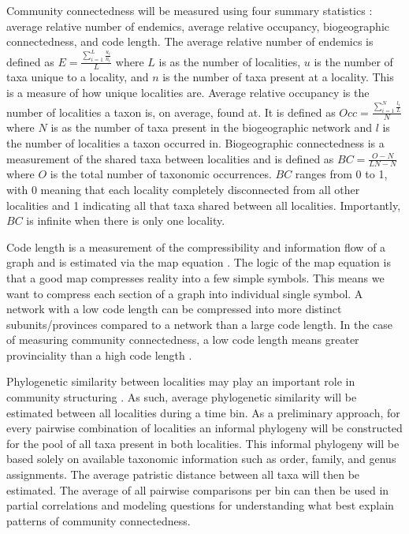 \documentclass[12pt,letterpaper]{article}
\begin{document}
Community connectedness will be measured using four summary statistics \citep{Sidor2013}: average relative number of endemics, average relative occupancy, biogeographic connectedness, and code length. The average relative number of endemics is defined as 
\(
  E = \frac{\sum_{i = 1}^{L} \frac{u_{i}}{n_{i}}}{L}
\)
where \(L\) is as the number of localities, \(u\) is the number of taxa unique to a locality, and \(n\) is the number of taxa present at a locality. This is a measure of how unique localities are. Average relative occupancy is the number of localities a taxon is, on average, found at. It is defined as 
\(
  Occ = \frac{\sum_{i = 1}^{N} \frac{l_{i}}{L}}{N}
\)
where \(N\) is as the number of taxa present in the biogeographic network and \(l\) is the number of localities a taxon occurred in. Biogeographic connectedness is a measurement of the shared taxa between localities and is defined as 
\(
  BC = \frac{O - N}{LN - N}
\)
where \(O\) is the total number of taxonomic occurrences. \(BC\) ranges from 0 to 1, with 0 meaning that each locality completely disconnected from all other localities and 1 indicating all that taxa shared between all localities. Importantly, \(BC\) is infinite when there is only one locality.

Code length is a measurement of the compressibility and information flow of a graph and is estimated via the map equation \citep{Rosvall2008,Rosvall2010b}. The logic of the map equation is that a good map compresses reality into a few simple symbols. This means we want to compress each section of a graph into individual single symbol. A network with a low code length can be compressed into more distinct subunits/provinces compared to a network than a large code length. In the case of measuring community connectedness, a low code length means greater provinciality than a high code length \citep{Sidor2013}. 

Phylogenetic similarity between localities may play an important role in community structuring \citep{Webb2002}. As such, average phylogenetic similarity will be estimated between all localities during a time bin. As a preliminary approach, for every pairwise combination of localities an informal phylogeny will be constructed for the pool of all taxa present in both localities. This informal phylogeny will be based solely on available taxonomic information such as order, family, and genus assignments. The average patristic distance between all taxa will then be estimated. The average of all pairwise comparisons per bin can then be used in partial correlations and modeling questions for understanding what best explain patterns of community connectedness.
\end{document}
